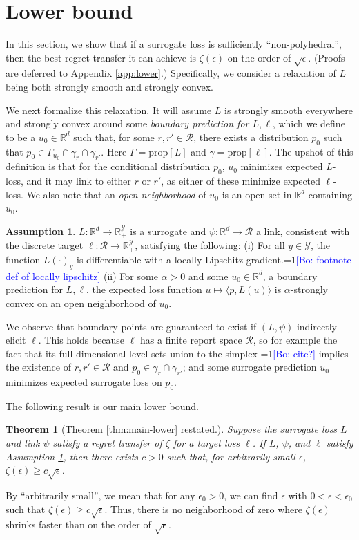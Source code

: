 \documentclass{article}
\newtheorem{theorem}{Theorem}
\theoremstyle{definition}\newtheorem{definition}{Definition}
\theoremstyle{definition}\newtheorem{assumption}{Assumption}
\newcommand{\Comments}{1}
\newcommand{\mynote}[2]{\ifnum\Comments=1\textcolor{#1}{#2}\fi}
\newcommand{\bo}[1]{\mynote{blue}{[Bo: #1]}}
\newcommand{\reals}{\mathbb{R}}
\newcommand{\prop}[1]{\mathrm{prop}[#1]}
\newcommand{\R}{\mathcal{R}}
\newcommand{\Y}{\mathcal{Y}}
\newcommand{\inprod}[2]{\langle #1, #2 \rangle}%
\begin{document}
\section{Lower bound} \label{sec:lower}

In this section, we show that if a surrogate loss is sufficiently ``non-polyhedral'', then the best regret transfer it can achieve is $\zeta(\epsilon)$ on the order of $\sqrt{\epsilon}$.
(Proofs are deferred to Appendix \ref{app:lower}.)
Specifically, we consider a relaxation of $L$ being both strongly smooth and strongly convex.

We next formalize this relaxation.
It will assume $L$ is strongly smooth everywhere and strongly convex around some \emph{boundary prediction for $L,\ell$}, which we define to be a $u_0 \in \reals^d$ such that, for some $r,r' \in \R$, there exists a distribution $p_0$ such that $p_0 \in \Gamma_{u_0} \cap \gamma_r \cap \gamma_{r'}$.
Here $\Gamma = \prop{L}$ and $\gamma = \prop{\ell}$.
The upshot of this definition is that for the conditional distribution $p_0$, $u_0$ minimizes expected $L$-loss, and it may link to either $r$ or $r'$, as either of these minimize expected $\ell$-loss.
We also note that an \emph{open neighborhood} of $u_0$ is an open set in $\reals^d$ containing $u_0$.

\begin{assumption} \label{assumption:lower}
  $L: \reals^d \to \reals^{\Y}_+$ is a surrogate and $\psi: \reals^d \to \R$ a link, consistent with the discrete target $\ell: \R \to \reals^{\Y}_+$, satisfying the following: (i) For all $y \in \Y$, the function $L(\cdot)_y$ is differentiable with a locally Lipschitz gradient.\bo{footnote def of locally lipschitz} (ii) For some $\alpha > 0$ and some $u_0 \in \reals^d$, a boundary prediction for $L,\ell$, the expected loss function $u \mapsto \inprod{p}{L(u)}$ is $\alpha$-strongly convex on an open neighborhood of $u_0$.
\end{assumption}

We observe that boundary points are guaranteed to exist if $(L,\psi)$ indirectly elicit $\ell$.
This holds because $\ell$ has a finite report space $\R$, so for example the fact that its full-dimensional level sets union to the simplex \bo{cite?} implies the existence of $r,r' \in \R$ and $p_0 \in \gamma_r \cap \gamma_{r'}$; and some surrogate prediction $u_0$ minimizes expected surrogate loss on $p_0$.

The following result is our main lower bound.
\begin{theorem}[Theorem \ref{thm:main-lower} restated.] \label{thm:main-lower-details}
  Suppose the surrogate loss $L$ and link $\psi$ satisfy a regret transfer of $\zeta$ for a target loss $\ell$.
  If $L$, $\psi$, and $\ell$ satisfy Assumption \ref{assumption:lower}, then there exists $c > 0$ such that, for arbitrarily small $\epsilon$, $\zeta(\epsilon) \geq c \sqrt{\epsilon}$.
\end{theorem}
By ``arbitrarily small'', we mean that for any $\epsilon_0 > 0$, we can find $\epsilon$ with $0 < \epsilon < \epsilon_0$ such that $\zeta(\epsilon) \geq c \sqrt{\epsilon}$.
Thus, there is no neighborhood of zero where $\zeta(\epsilon)$ shrinks faster than on the order of $\sqrt{\epsilon}$.
\end{document}

